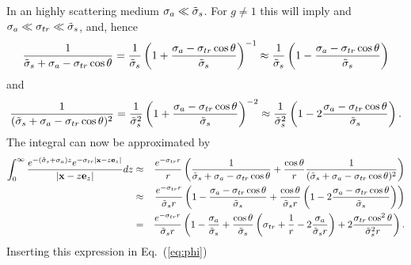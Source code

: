 \documentclass[10pt,a4paper]{article}
\begin{document}
In an highly scattering medium $\sigma_a \ll \tilde{\sigma}_s$. For $g \ne 1$ this
will imply and $\sigma_a \ll \sigma_{tr} \ll \tilde{\sigma}_s$, and, hence
\begin{equation}
    \frac{1}{\tilde{\sigma}_s + \sigma_a - \sigma_{tr} \cos \theta} =
    \frac{1}{\tilde{\sigma}_s} \left(1 +
    \frac{\sigma_a - \sigma_{tr} \cos \theta}{\tilde{\sigma}_s}  \right)^{-1} \approx
    \frac{1}{\tilde{\sigma}_s}  \left(1 -
    \frac{\sigma_a - \sigma_{tr} \cos \theta}{\tilde{\sigma}_s}  \right)
\end{equation}
and
\begin{equation}
    \frac{1}{(\tilde{\sigma}_s + \sigma_a - \sigma_{tr} \cos \theta)^2} =
    \frac{1}{\tilde{\sigma}_s^2} \left(1 + \frac{\sigma_a - \sigma_{tr} \cos \theta}{\tilde{\sigma}_s}  \right)^{-2} \approx
    \frac{1}{\tilde{\sigma}_s^2}  \left(1 - 2 \frac{\sigma_a - \sigma_{tr} \cos \theta}{\tilde{\sigma}_s}  \right).
\end{equation}
The integral can now be approximated by
\begin{eqnarray*}
     \int_0^\infty  \frac{e^{-(\tilde{\sigma}_s + \sigma_a)z} e^{-\sigma_{tr}|\mathbf{x}
    - z \mathbf{e}_z| }}{|\mathbf{x} - z \mathbf{e}_z|} d z & \approx &
   \frac{e^{-\sigma_{tr} r}}{r} \left( \frac{1}{\tilde{\sigma}_s + \sigma_a - \sigma_{tr}
    \cos \theta } + \frac{\cos \theta}{r} \frac{1}{(\tilde{\sigma}_s + \sigma_a - \sigma_{tr} \cos \theta)^2}
    \right) \\
    &\approx & \frac{e^{-\sigma_{tr} r}}{\tilde{\sigma}_s r} \left(1 -
    \frac{\sigma_a - \sigma_{tr} \cos \theta}{\tilde{\sigma}_s}      +  \frac{\cos \theta}{\tilde{\sigma}_s r} \left(1 - 2 \frac{\sigma_a - \sigma_{tr} \cos \theta}{\tilde{\sigma}_s}  \right)
    \right) \\
    &=&\frac{e^{-\sigma_{tr} r}}{\tilde{\sigma}_s r} \left(1 -
    \frac{\sigma_a}{\tilde{\sigma}_s} + \frac{\cos \theta}{\tilde{\sigma}_s} \left(
    \sigma_{tr} + \frac{1}{r} - 2 \frac{\sigma_a}{\tilde{\sigma}_s r} \right) + 2
    \frac{\sigma_{tr} \cos^2\theta}{\tilde{\sigma}_s^2 r} \right).
\end{eqnarray*}
Inserting this expression in Eq.~(\ref{eq:phi})
\end{document}
